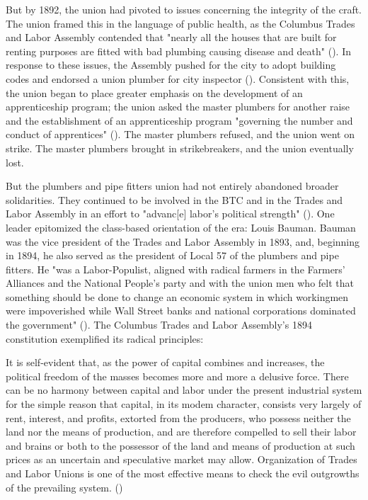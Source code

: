 \documentclass[12pt]{article}
\renewenvironment{quote}
  {\list{}{\leftmargin=\parindent\rightmargin=0pt}%
   \item\relax}
  {\endlist}
\begin{document}
But by 1892, the union had pivoted to issues concerning the integrity of the craft. The union framed this in the language of public health, as the Columbus Trades and Labor Assembly contended that "nearly all the houses that are built for renting purposes are fitted with bad plumbing causing disease and death" (\cite[47–48]{schneirovPrideSolidarityHistory1993}). In response to these issues, the Assembly pushed for the city to adopt building codes and endorsed a union plumber for city inspector (\citeyear[48]{schneirovPrideSolidarityHistory1993}). Consistent with this, the union began to place greater emphasis on the development of an apprenticeship program; the union asked the master plumbers for another raise and the establishment of an apprenticeship program "governing the number and conduct of apprentices" (\citeyear[48]{schneirovPrideSolidarityHistory1993}). The master plumbers refused, and the union went on strike. The master plumbers brought in strikebreakers, and the union eventually lost.

But the plumbers and pipe fitters union had not entirely abandoned broader solidarities. They continued to be involved in the BTC and in the Trades and Labor Assembly in an effort to "advanc[e] labor’s political strength" (\cite[50]{schneirovPrideSolidarityHistory1993}). One leader epitomized the class-based orientation of the era: Louis Bauman. Bauman was the vice president of the Trades and Labor Assembly in 1893, and, beginning in 1894, he also served as the president of Local 57 of the plumbers and pipe fitters. He "was a Labor-Populist, aligned with radical farmers in the Farmers’ Alliances and the National People’s party and with the union men who felt that something should be done to change an economic system in which workingmen were impoverished while Wall Street banks and national corporations dominated the government" (\citeyear[50]{schneirovPrideSolidarityHistory1993}). The Columbus Trades and Labor Assembly’s 1894 constitution exemplified its radical principles:

\begin{quote}
It is self-evident that, as the power of capital combines and increases, the political freedom of the masses becomes more and more a delusive force. There can be no harmony between capital and labor under the present industrial system for the simple reason that capital, in its modem character, consists very largely of rent, interest, and profits, extorted from the producers, who possess neither the land nor the means of production, and are therefore compelled to sell their labor and brains or both to the possessor of the land and means of production at such prices as an uncertain and speculative market may allow. Organization of Trades and Labor Unions is one of the most effective means to check the evil outgrowths of the prevailing system. (\cite[50]{schneirovPrideSolidarityHistory1993})
\end{quote}
\end{document}
